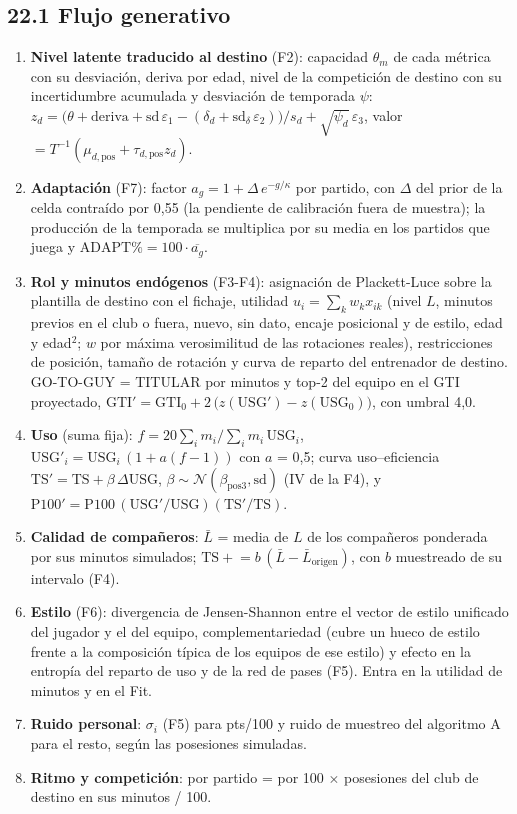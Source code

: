 \documentclass[10pt,a4paper]{article}
\begin{document}
\subsection*{22.1 Flujo generativo}
\begin{enumerate}
  \item \textbf{Nivel latente traducido al destino} (F2): capacidad $\theta_m$ de cada métrica con su desviación, deriva por edad, nivel de la competición de destino con su incertidumbre acumulada y desviación de temporada $\psi$: $z_d = \big(\theta + \text{deriva} + \mathrm{sd}\,\varepsilon_1 - (\delta_d + \mathrm{sd}_\delta\,\varepsilon_2)\big)/s_d + \sqrt{\psi_d}\,\varepsilon_3$, valor $= T^{-1}(\mu_{d,\mathrm{pos}} + \tau_{d,\mathrm{pos}} z_d)$.
  \item \textbf{Adaptación} (F7): factor $a_g = 1 + \Delta\,e^{-g/\kappa}$ por partido, con $\Delta$ del prior de la celda contraído por 0,55 (la pendiente de calibración fuera de muestra); la producción de la temporada se multiplica por su media en los partidos que juega y $\mathrm{ADAPT\%} = 100\cdot\overline{a_g}$.
  \item \textbf{Rol y minutos endógenos} (F3-F4): asignación de Plackett-Luce sobre la plantilla de destino con el fichaje, utilidad $u_i = \sum_k w_k x_{ik}$ (nivel $L$, minutos previos en el club o fuera, nuevo, sin dato, encaje posicional y de estilo, edad y edad\ensuremath{^{2}}; $w$ por máxima verosimilitud de las rotaciones reales), restricciones de posición, tamaño de rotación y curva de reparto del entrenador de destino. GO-TO-GUY = TITULAR por minutos y top-2 del equipo en el GTI proyectado, $\mathrm{GTI}' = \mathrm{GTI}_0 + 2\,\big(z(\mathrm{USG}') - z(\mathrm{USG}_0)\big)$, con umbral 4,0.
  \item \textbf{Uso} (suma fija): $f = 20\sum_i m_i / \sum_i m_i\,\mathrm{USG}_i$, $\mathrm{USG}'_i = \mathrm{USG}_i\,(1 + a(f-1))$ con $a$ = 0,5; curva uso--eficiencia $\mathrm{TS}' = \mathrm{TS} + \beta\,\Delta\mathrm{USG}$, $\beta \sim \mathcal N(\beta_{\mathrm{pos3}}, \mathrm{sd})$ (IV de la F4), y $\mathrm{P100}' = \mathrm{P100}\,(\mathrm{USG}'/\mathrm{USG})(\mathrm{TS}'/\mathrm{TS})$.
  \item \textbf{Calidad de compañeros}: $\bar L$ = media de $L$ de los compañeros ponderada por sus minutos simulados; $\mathrm{TS} \mathrel{+}= b\,(\bar L - \bar L_{\mathrm{origen}})$, con $b$ muestreado de su intervalo (F4).
  \item \textbf{Estilo} (F6): divergencia de Jensen-Shannon entre el vector de estilo unificado del jugador y el del equipo, complementariedad (cubre un hueco de estilo frente a la composición típica de los equipos de ese estilo) y efecto en la entropía del reparto de uso y de la red de pases (F5). Entra en la utilidad de minutos y en el Fit.
  \item \textbf{Ruido personal}: $\sigma_i$ (F5) para pts/100 y ruido de muestreo del algoritmo A para el resto, según las posesiones simuladas.
  \item \textbf{Ritmo y competición}: por partido = por 100 \ensuremath{\times} posesiones del club de destino en sus minutos / 100.
\end{enumerate}
\end{document}
